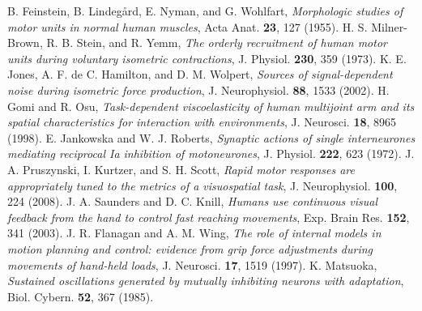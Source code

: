  B. Feinstein, B. Lindeg{\aa}rd, E. Nyman, and G. Wohlfart, \emph{Morphologic studies of motor units in normal human muscles}, Acta Anat. \textbf{23}, 127 (1955).
 H. S. Milner-Brown, R. B. Stein, and R. Yemm, \emph{The orderly recruitment of human motor units during voluntary isometric contractions}, J. Physiol. \textbf{230}, 359 (1973).
 K. E. Jones, A. F. de C. Hamilton, and D. M. Wolpert, \emph{Sources of signal-dependent noise during isometric force production}, J. Neurophysiol. \textbf{88}, 1533 (2002).
 H. Gomi and R. Osu, \emph{Task-dependent viscoelasticity of human multijoint arm and its spatial characteristics for interaction with environments}, J. Neurosci. \textbf{18}, 8965 (1998).
 E. Jankowska and W. J. Roberts, \emph{Synaptic actions of single interneurones mediating reciprocal Ia inhibition of motoneurones}, J. Physiol. \textbf{222}, 623 (1972).
 J. A. Pruszynski, I. Kurtzer, and S. H. Scott, \emph{Rapid motor responses are appropriately tuned to the metrics of a visuospatial task}, J. Neurophysiol. \textbf{100}, 224 (2008).
 J. A. Saunders and D. C. Knill, \emph{Humans use continuous visual feedback from the hand to control fast reaching movements}, Exp. Brain Res. \textbf{152}, 341 (2003).
 J. R. Flanagan and A. M. Wing, \emph{The role of internal models in motion planning and control: evidence from grip force adjustments during movements of hand-held loads}, J. Neurosci. \textbf{17}, 1519 (1997).
 K. Matsuoka, \emph{Sustained oscillations generated by mutually inhibiting neurons with adaptation}, Biol. Cybern. \textbf{52}, 367 (1985).
